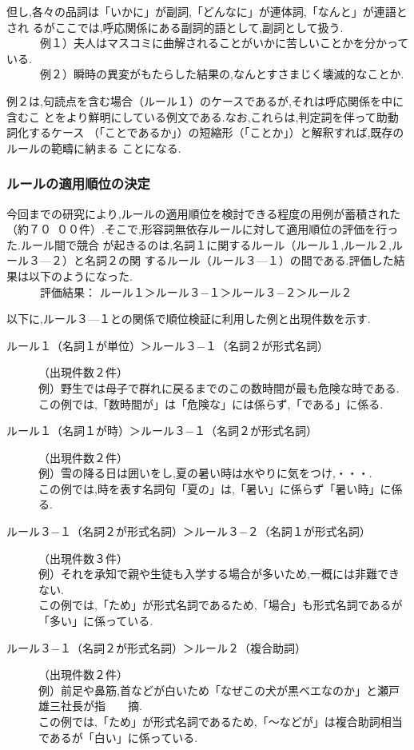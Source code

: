 但し,各々の品詞は「いかに」が副詞,「どんなに」が連体詞,「なんと」が連語とされ
るがここでは,呼応関係にある副詞的語として,副詞として扱う.\\
　　　例１）夫人はマスコミに曲解されることがいかに苦しいことかを分かっている.\\
　　　例２）瞬時の異変がもたらした結果の,なんとすさまじく壊滅的なことか.

例２は,句読点を含む場合（ルール１）のケースであるが,それは呼応関係を中に含むこ
とをより鮮明にしている例文である.なお,これらは,判定詞を伴って助動詞化するケース
（「ことであるか」）の短縮形（「ことか」）と解釈すれば,既存のルールの範疇に納まる
ことになる.

\subsubsection{ルールの適用順位の決定}

今回までの研究により,ルールの適用順位を検討できる程度の用例が蓄積された（\mbox{約７０
００}件）.そこで,形容詞無依存ルールに対して適用順位の評価を行った.ルール間で競合
が起きるのは,名詞１に関するルール（ルール１,ルール２,ルール３—２）と名詞２の関
するルール（ルール３—１）の間である.評価した結果は以下のようになった.\\
　　　評価結果：   ルール１＞ルール３−１＞ルール３−２＞ルール２

以下に,ルール３—１との関係で順位検証に利用した例と出現件数を示す.
\begin{description}
\item[ルール１（名詞１が単位）＞ルール３−１（名詞２が形式名詞）]（出現件数２件）\\
        例）野生では母子で群れに戻るまでのこの数時間が最も危険な時である.\\
        この例では,「数時間が」は「危険な」には係らず,「である」に係る.
\item[ルール１（名詞１が時）＞ルール３−１（名詞２が形式名詞）]（出現件数２件）\\
        例）雪の降る日は囲いをし,夏の暑い時は水やりに気をつけ,・・・.\\
        この例では,時を表す名詞句「夏の」は,「暑い」に係らず「暑い時」に係る.
\item[ルール３−１（名詞２が形式名詞）＞ルール３−２（名詞１が形式名詞）]（出現件数３件）\\
        例）それを承知で親や生徒も入学する場合が多いため,一概には非難できない.\\
        この例では,「ため」が形式名詞であるため,「場合」も形式名詞であるが「多い」に係っている.
\item[ルール３−１（名詞２が形式名詞）＞ルール２（複合助詞）]（出現件数２件）\\
        例）前足や鼻筋,首などが白いため「なぜこの犬が黒ベエなのか」と瀬戸雄三社長が指　　摘.\\
        この例では,「ため」が形式名詞であるため,「〜などが」は複合助詞相当であるが「白い」に係っている.
\end{description}

